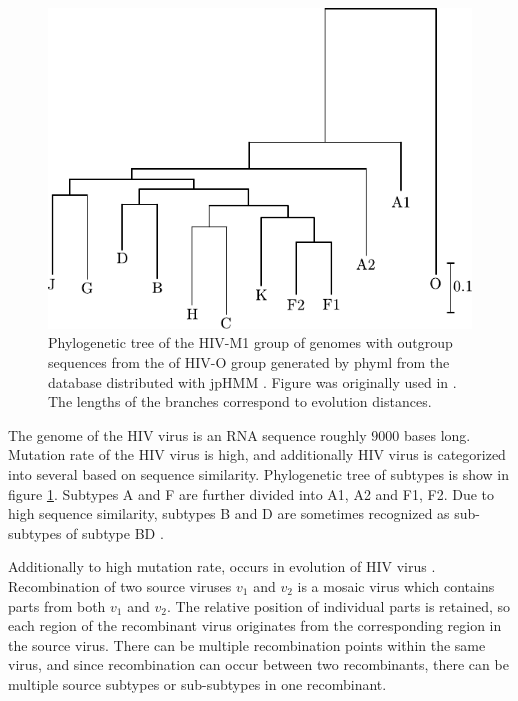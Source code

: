\begin{figure}
\begin{center}
\includegraphics{../figures/hiv_M1strom}
\end{center}
\caption[Phylogenetic tree of the HIV-M1 group]{Phylogenetic tree of the HIV-M1
group of genomes with outgroup sequences from the of HIV-O group generated by phyml \cite{Guidon2003}
from the database distributed with jpHMM \cite{Schultz2006}. Figure was originally
used in \cite{Nanasi2010mgr}. The lengths of the branches correspond to 
evolution distances.  }\label{app:figure:phil}
\end{figure}

The genome of the HIV virus is an RNA sequence roughly $9000$ bases long.
Mutation rate of the HIV virus is high\cite{}, and additionally HIV virus is
categorized into several \cite{} based on sequence
similarity. Phylogenetic tree of subtypes is show in figure
\ref{app:figure:phil}.  Subtypes A and F are further divided into
 A1, A2 and F1, F2.  Due to high sequence similarity,
subtypes B and D are sometimes recognized as sub-subtypes of subtype BD
\cite{}.

Additionally to high mutation rate,  occurs in
evolution of HIV virus \cite{}. Recombination of two source viruses $v_1$
and $v_2$ is a mosaic virus which contains parts from both $v_1$ and $v_2$.  The
relative position of individual parts is retained, so each region of the
recombinant virus originates from the corresponding region in the source virus.
There can be multiple recombination points within the same virus, and since
recombination can occur between two recombinants, there can be multiple source
subtypes or sub-subtypes in one recombinant. 

